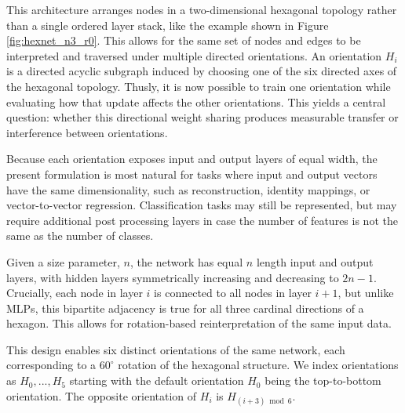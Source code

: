 This architecture arranges nodes in a two-dimensional hexagonal topology rather than a single ordered layer stack, like the example shown in Figure \ref{fig:hexnet_n3_r0}.
This allows for the same set of nodes and edges to be interpreted and traversed under multiple directed orientations.
An orientation $H_i$ is a directed acyclic subgraph induced by choosing one of the six directed axes of the hexagonal topology.
Thusly, it is now possible to train one orientation while evaluating how that update affects the other orientations.
This yields a central question: whether this directional weight sharing produces measurable transfer or interference between orientations.


Because each orientation exposes input and output layers of equal width, the present formulation is most natural for tasks where input and output vectors have the same dimensionality, such as reconstruction, identity mappings, or vector-to-vector regression.
Classification tasks may still be represented, but may require additional post processing layers in case the number of features is not the same as the number of classes.

Given a size parameter, $n$, the network has equal $n$ length input and output layers, with hidden layers symmetrically increasing and decreasing to $2n-1$.
Crucially, each node in layer $i$ is connected to all nodes in layer $i+1$, but unlike MLPs, this bipartite adjacency is true for all three cardinal directions of a hexagon.
This allows for rotation-based reinterpretation of the same input data.


This design enables six distinct orientations of the same network, each corresponding to a $60^\circ$ rotation of the hexagonal structure.
We index orientations as $H_0, ..., H_5$ starting with the default orientation $H_0$ being the top-to-bottom orientation.
The opposite orientation of $H_i$ is $H_{(i+3) \bmod 6}$.

